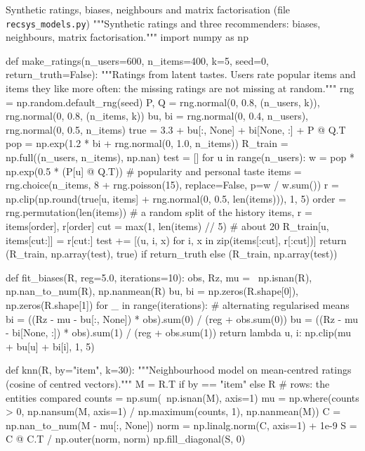\begin{pylisting}[label={lst:recmodels}]{Synthetic ratings, biases, neighbours and matrix factorisation (file \texttt{recsys\_models.py})}
"""Synthetic ratings and three recommenders: biases, neighbours, matrix factorisation."""
import numpy as np

def make_ratings(n_users=600, n_items=400, k=5, seed=0, return_truth=False):
    """Ratings from latent tastes. Users rate popular items and items they like more
    often: the missing ratings are not missing at random."""
    rng = np.random.default_rng(seed)
    P, Q = rng.normal(0, 0.8, (n_users, k)), rng.normal(0, 0.8, (n_items, k))
    bu, bi = rng.normal(0, 0.4, n_users), rng.normal(0, 0.5, n_items)
    true = 3.3 + bu[:, None] + bi[None, :] + P @ Q.T
    pop = np.exp(1.2 * bi + rng.normal(0, 1.0, n_items))
    R_train = np.full((n_users, n_items), np.nan)
    test = []
    for u in range(n_users):
        w = pop * np.exp(0.5 * (P[u] @ Q.T))           # popularity and personal taste
        items = rng.choice(n_items, 8 + rng.poisson(15), replace=False, p=w / w.sum())
        r = np.clip(np.round(true[u, items] + rng.normal(0, 0.5, len(items))), 1, 5)
        order = rng.permutation(len(items))            # a random split of the history
        items, r = items[order], r[order]
        cut = max(1, len(items) // 5)                  # about 20%
        R_train[u, items[cut:]] = r[cut:]
        test += [(u, i, x) for i, x in zip(items[:cut], r[:cut])]
    return (R_train, np.array(test), true) if return_truth else (R_train, np.array(test))

def fit_biases(R, reg=5.0, iterations=10):
    obs, Rz, mu = ~np.isnan(R), np.nan_to_num(R), np.nanmean(R)
    bu, bi = np.zeros(R.shape[0]), np.zeros(R.shape[1])
    for _ in range(iterations):                        # alternating regularised means
        bi = ((Rz - mu - bu[:, None]) * obs).sum(0) / (reg + obs.sum(0))
        bu = ((Rz - mu - bi[None, :]) * obs).sum(1) / (reg + obs.sum(1))
    return lambda u, i: np.clip(mu + bu[u] + bi[i], 1, 5)

def knn(R, by="item", k=30):
    """Neighbourhood model on mean-centred ratings (cosine of centred vectors)."""
    M = R.T if by == "item" else R                     # rows: the entities compared
    counts = np.sum(~np.isnan(M), axis=1)
    mu = np.where(counts > 0, np.nansum(M, axis=1) / np.maximum(counts, 1), np.nanmean(M))
    C = np.nan_to_num(M - mu[:, None])
    norm = np.linalg.norm(C, axis=1) + 1e-9
    S = C @ C.T / np.outer(norm, norm)
    np.fill_diagonal(S, 0)


\end{pylisting}
